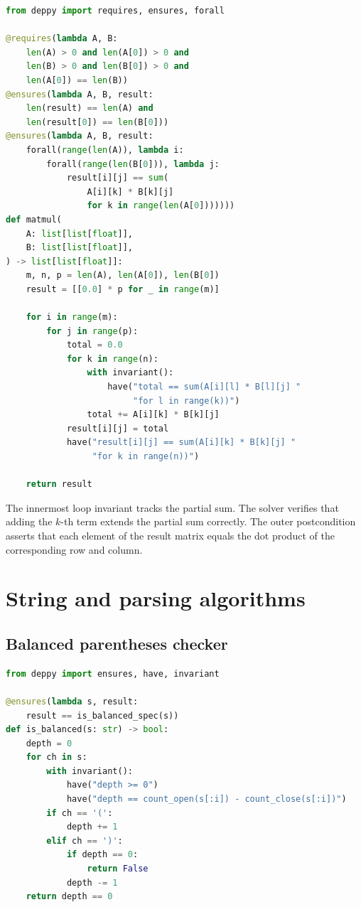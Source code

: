 \documentclass[11pt]{report}
\theoremstyle{definition}
\theoremstyle{plain}
\begin{document}
\begin{lstlisting}[style=deppy,language=Python]
from deppy import requires, ensures, forall

@requires(lambda A, B:
    len(A) > 0 and len(A[0]) > 0 and
    len(B) > 0 and len(B[0]) > 0 and
    len(A[0]) == len(B))
@ensures(lambda A, B, result:
    len(result) == len(A) and
    len(result[0]) == len(B[0]))
@ensures(lambda A, B, result:
    forall(range(len(A)), lambda i:
        forall(range(len(B[0])), lambda j:
            result[i][j] == sum(
                A[i][k] * B[k][j]
                for k in range(len(A[0]))))))
def matmul(
    A: list[list[float]],
    B: list[list[float]],
) -> list[list[float]]:
    m, n, p = len(A), len(A[0]), len(B[0])
    result = [[0.0] * p for _ in range(m)]

    for i in range(m):
        for j in range(p):
            total = 0.0
            for k in range(n):
                with invariant():
                    have("total == sum(A[i][l] * B[l][j] "
                         "for l in range(k))")
                total += A[i][k] * B[k][j]
            result[i][j] = total
            have("result[i][j] == sum(A[i][k] * B[k][j] "
                 "for k in range(n))")

    return result
\end{lstlisting}

The innermost loop invariant tracks the partial sum. The solver verifies
that adding the $k$-th term extends the partial sum correctly. The outer
postcondition asserts that each element of the result matrix equals the
dot product of the corresponding row and column.

\section{String and parsing algorithms}

\subsection{Balanced parentheses checker}

\begin{lstlisting}[style=deppy,language=Python]
from deppy import ensures, have, invariant

@ensures(lambda s, result:
    result == is_balanced_spec(s))
def is_balanced(s: str) -> bool:
    depth = 0
    for ch in s:
        with invariant():
            have("depth >= 0")
            have("depth == count_open(s[:i]) - count_close(s[:i])")
        if ch == '(':
            depth += 1
        elif ch == ')':
            if depth == 0:
                return False
            depth -= 1
    return depth == 0
\end{lstlisting}
\end{document}
